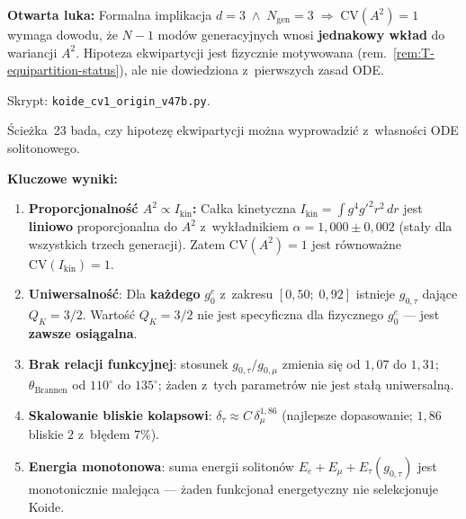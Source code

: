 \begin{remark}[Dlaczego $\mathrm{CV} = 1$? --- \'scie\.zka 22 (v47b)]
\medskip\noindent
\textbf{Otwarta luka:}
Formalna implikacja
$d = 3 \;\wedge\; N_{\mathrm{gen}} = 3 \;\Longrightarrow\;
\mathrm{CV}(A^2) = 1$ wymaga dowodu,
\.ze $N{-}1$ mod\'ow generacyjnych wnosi
\textbf{jednakowy wk\l{}ad} do wariancji $A^2$.
Hipoteza ekwipartycji jest fizycznie motywowana
(rem.~\ref{rem:T-equipartition-status}),
ale nie dowiedziona z~pierwszych zasad ODE.

Skrypt: \texttt{koide\_cv1\_origin\_v47b.py}.
\end{remark}

\begin{remark}%
\label{rem:T-equipartition-test}
\'Scie\.zka~23 bada, czy hipotez\k{e} ekwipartycji mo\.zna
wyprowadzi\'c z~w\l{}asno\'sci ODE solitonowego.

\medskip\noindent
\textbf{Kluczowe wyniki:}
\begin{enumerate}[nosep]
  \item \textbf{Proporcjonalno\'s\'c $A^2 \propto I_{\mathrm{kin}}$:}
    Ca\l{}ka kinetyczna $I_{\mathrm{kin}} = \int g^4 g'^2 r^2\,dr$ jest
    \textbf{liniowo} proporcjonalna do $A^2$ z~wyk\l{}adnikiem
    $\alpha = 1{,}000 \pm 0{,}002$ (sta\l{}y dla wszystkich trzech
    generacji).
    Zatem $\mathrm{CV}(A^2) = 1$ jest r\'ownowa\.zne
    $\mathrm{CV}(I_{\mathrm{kin}}) = 1$.
  \item \textbf{Uniwersalno\'s\'c}: Dla \textbf{ka\.zdego} $g_0^e$
    z~zakresu $[0{,}50;\; 0{,}92]$ istnieje $g_{0,\tau}$ daj\k{a}ce
    $Q_K = 3/2$. Warto\'s\'c $Q_K = 3/2$ nie jest specyficzna
    dla fizycznego $g_0^e$ --- jest \textbf{zawsze osi\k{a}galna}.
  \item \textbf{Brak relacji funkcyjnej}: stosunek
    $g_{0,\tau}/g_{0,\mu}$ zmienia si\k{e} od $1{,}07$ do $1{,}31$;
    $\theta_{\mathrm{Brannen}}$ od $110^\circ$ do $135^\circ$;
    \.zaden z~tych parametr\'ow nie jest sta\l{}\k{a} uniwersaln\k{a}.
  \item \textbf{Skalowanie bliskie kolapsowi}:
    $\delta_\tau \approx C\,\delta_\mu^{1{,}86}$
    (najlepsze dopasowanie; $1{,}86$ bliskie $2$
    z~b\l{}\k{e}dem $7\%$).
  \item \textbf{Energia monotonowa}: suma energii soliton\'ow
    $E_e + E_\mu + E_\tau(g_{0,\tau})$ jest monotonicznie
    malej\k{a}ca --- \.zaden funkcjona\l{} energetyczny nie
    selekcjonuje Koide.
\end{enumerate}


\end{remark}

